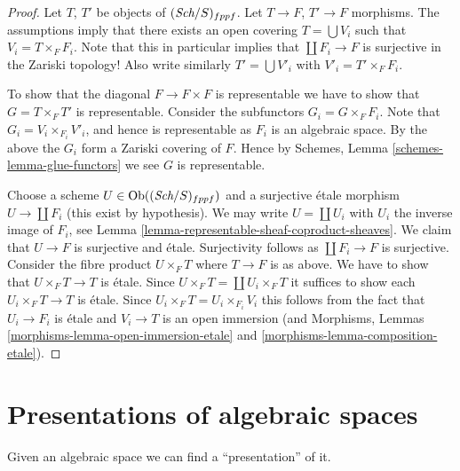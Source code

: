 \begin{proof}
Let $T$, $T'$ be objects of $(\textit{Sch}/S)_{fppf}$.
Let $T \to F$, $T' \to F$ morphisms.
The assumptions imply that there exists an open covering
$T = \bigcup V_i$ such that $V_i = T \times_F F_i$.
Note that this in particular implies that
$\coprod F_i \to F$ is surjective in the Zariski topology!
Also write similarly $T' = \bigcup V'_i$ with $V'_i = T' \times_F F_i$.

\medskip\noindent
To show that the diagonal $F \to F \times F$ is representable
we have to show that $G = T \times_F T'$ is representable.
Consider the subfunctors $G_i = G \times_F F_i$.
Note that $G_i = V_i \times_{F_i} V'_i$, and hence is representable
as $F_i$ is an algebraic space.
By the above the $G_i$ form a Zariski covering of $F$.
Hence by Schemes, Lemma \ref{schemes-lemma-glue-functors}
we see $G$ is representable.

\medskip\noindent
Choose a scheme $U \in \mathop{\rm Ob}\nolimits((\textit{Sch}/S)_{fppf})$
and a surjective
\'etale morphism $U \to \coprod F_i$ (this exist by hypothesis).
We may write $U = \coprod U_i$ with $U_i$ the inverse image of $F_i$,
see Lemma \ref{lemma-representable-sheaf-coproduct-sheaves}.
We claim that $U \to F$ is surjective and
\'etale. Surjectivity follows as $\coprod F_i \to F$ is surjective.
Consider the fibre product $U \times_F T$ where $T \to F$ is as
above. We have to show that $U \times_F T \to T$ is \'etale.
Since $U \times_F T = \coprod U_i \times_F T$ it suffices to show
each $U_i \times_F T \to T$ is \'etale. Since
$U_i \times_F T = U_i \times_{F_i} V_i$ this follows from the
fact that $U_i \to F_i$ is \'etale and $V_i \to T$ is an open immersion
(and Morphisms, Lemmas \ref{morphisms-lemma-open-immersion-etale}
and \ref{morphisms-lemma-composition-etale}).
\end{proof}














\section{Presentations of algebraic spaces}
\label{section-presentations}

\noindent
Given an algebraic space we can find a ``presentation'' of it.



